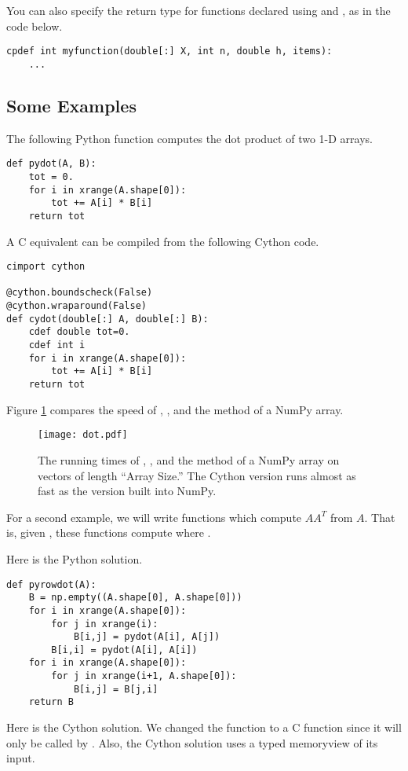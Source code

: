 You can also specify the return type for functions declared using  and , as in the code below.
\begin{lstlisting}
cpdef int myfunction(double[:] X, int n, double h, items):
    ...
\end{lstlisting}

\subsection*{Some Examples}
The following Python function computes the dot product of two 1-D arrays.
\begin{lstlisting}
def pydot(A, B):
    tot = 0.
    for i in xrange(A.shape[0]):
        tot += A[i] * B[i]
    return tot
\end{lstlisting}
A C equivalent can be compiled from the following Cython code.
\begin{lstlisting}
cimport cython

@cython.boundscheck(False)
@cython.wraparound(False)
def cydot(double[:] A, double[:] B):
    cdef double tot=0.
    cdef int i
    for i in xrange(A.shape[0]):
        tot += A[i] * B[i]
    return tot
\end{lstlisting}

Figure \ref{cython:dot} compares the speed of , , and the  method of a NumPy array.

\begin{figure}
\centering
\texttt{[image: dot.pdf]}
\caption{The running times of , , and the  method of a NumPy array on vectors of length ``Array Size.''
The Cython version runs almost as fast as the version built into NumPy.}
\label{cython:dot}
\end{figure}

For a second example, we will write functions which compute $AA^T$ from $A$.
That is, given , these functions compute  where
.

Here is the Python solution.
\begin{lstlisting}
def pyrowdot(A):
    B = np.empty((A.shape[0], A.shape[0]))
    for i in xrange(A.shape[0]):
        for j in xrange(i):
            B[i,j] = pydot(A[i], A[j])
        B[i,i] = pydot(A[i], A[i])
    for i in xrange(A.shape[0]):
        for j in xrange(i+1, A.shape[0]):
            B[i,j] = B[j,i]
    return B
\end{lstlisting}

Here is the Cython solution. 
We changed the function  to a C function since it will only be called by .
Also, the Cython solution uses a typed memoryview of its input.

